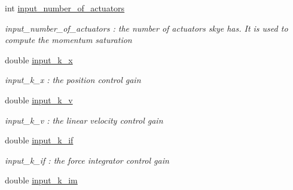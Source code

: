 \begin{DoxyCompactItemize}
\item 
\hypertarget{struct_skye_parameters_a6629521e0b41c5f3729c6bd795c8f787}{int \hyperlink{struct_skye_parameters_a6629521e0b41c5f3729c6bd795c8f787}{input\-\_\-number\-\_\-of\-\_\-actuators}}\label{struct_skye_parameters_a6629521e0b41c5f3729c6bd795c8f787}

\begin{DoxyCompactList}\small\item\em input\-\_\-number\-\_\-of\-\_\-actuators \-: the number of actuators skye has. It is used to compute the momentum saturation \end{DoxyCompactList}\item 
\hypertarget{struct_skye_parameters_ae95683393a970fb87018925875109c4a}{double \hyperlink{struct_skye_parameters_ae95683393a970fb87018925875109c4a}{input\-\_\-k\-\_\-x}}\label{struct_skye_parameters_ae95683393a970fb87018925875109c4a}

\begin{DoxyCompactList}\small\item\em input\-\_\-k\-\_\-x \-: the position control gain \end{DoxyCompactList}\item 
\hypertarget{struct_skye_parameters_a5e8389a9b91d5c1a46631ec59086d166}{double \hyperlink{struct_skye_parameters_a5e8389a9b91d5c1a46631ec59086d166}{input\-\_\-k\-\_\-v}}\label{struct_skye_parameters_a5e8389a9b91d5c1a46631ec59086d166}

\begin{DoxyCompactList}\small\item\em input\-\_\-k\-\_\-v \-: the linear velocity control gain \end{DoxyCompactList}\item 
\hypertarget{struct_skye_parameters_ade9a063996652903688f9d5772dba9b9}{double \hyperlink{struct_skye_parameters_ade9a063996652903688f9d5772dba9b9}{input\-\_\-k\-\_\-if}}\label{struct_skye_parameters_ade9a063996652903688f9d5772dba9b9}

\begin{DoxyCompactList}\small\item\em input\-\_\-k\-\_\-if \-: the force integrator control gain \end{DoxyCompactList}\item 
\hypertarget{struct_skye_parameters_a1ef90e774334e2760de74c2145560289}{double \hyperlink{struct_skye_parameters_a1ef90e774334e2760de74c2145560289}{input\-\_\-k\-\_\-im}}\label{struct_skye_parameters_a1ef90e774334e2760de74c2145560289}


\end{DoxyCompactItemize}
